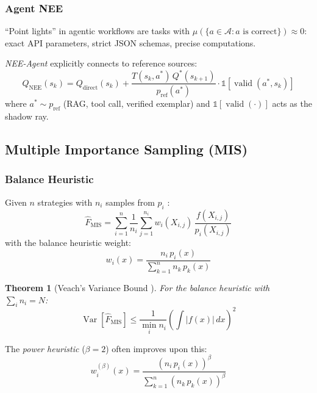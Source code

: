 \documentclass[11pt,twocolumn]{article}
\newtheorem{theorem}{Theorem}[section]
\theoremstyle{definition}
\newcommand{\Var}{\operatorname{Var}}
\newcommand{\Aspace}{\mathcal{A}}
\newcommand{\pref}{p_{\text{ref}}}
\newcommand{\Qdirect}{Q_{\text{direct}}}
\begin{document}
\subsubsection{Agent NEE}

``Point lights'' in agentic workflows are tasks with
$\mu(\{a \in \Aspace : a \text{ is correct}\}) \approx 0$:
exact API parameters, strict JSON schemas, precise computations.

\emph{NEE-Agent} explicitly connects to reference sources:
\begin{equation}\label{eq:nee-agent}
  \hat{Q}_{\text{NEE}}(s_k)
    = \Qdirect(s_k)
    + \frac{T(s_k, a^*)\,Q^*(s_{k+1})}{\pref(a^*)}
      \cdot \mathbb{1}[\operatorname{valid}(a^*, s_k)]
\end{equation}
where $a^* \sim \pref$ (RAG, tool call, verified exemplar)
and $\mathbb{1}[\operatorname{valid}(\cdot)]$ acts as the shadow ray.

\subsection{Multiple Importance Sampling (MIS)}\label{sec:mis}

\subsubsection{Balance Heuristic}

Given $n$ strategies with $n_i$ samples from $p_i$
\citep{veach1995optimally}:
\begin{equation}\label{eq:mis}
  \hat{F}_{\text{MIS}} = \sum_{i=1}^{n} \frac{1}{n_i}
    \sum_{j=1}^{n_i} w_i(X_{i,j})\,\frac{f(X_{i,j})}{p_i(X_{i,j})}
\end{equation}
with the balance heuristic weight:
\begin{equation}\label{eq:balance}
  w_i(x) = \frac{n_i\,p_i(x)}{\sum_{k=1}^{n} n_k\,p_k(x)}
\end{equation}

\begin{theorem}[Veach's Variance Bound {\citep{veach1995optimally}}]\label{thm:veach-bound}
For the balance heuristic with $\sum_i n_i = N$:
\begin{equation}\label{eq:veach-bound}
  \Var[\hat{F}_{\mathrm{MIS}}]
    \leq \frac{1}{\min_i n_i}
    \left(\int |f(x)|\,dx\right)^{\!2}
\end{equation}
\end{theorem}

The \emph{power heuristic} ($\beta = 2$) often improves upon this:
\begin{equation}\label{eq:power-heuristic}
  w_i^{(\beta)}(x) = \frac{(n_i\,p_i(x))^\beta}{\sum_{k=1}^{n}(n_k\,p_k(x))^\beta}
\end{equation}
\end{document}
